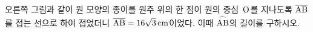 \noindent\begin{minipage}[t]{0.58\linewidth}\vspace{0pt}\raggedright 오른쪽 그림과 같이 원 모양의 종이를 원주 위의 한 점이 원의 중심~$\mathrm{O}$를 지나도록 $\overline{\mathrm{AB}}$를 접는 선으로 하여 접었더니 $\overline{\mathrm{AB}}=16\sqrt{3}\,\mathrm{cm}$이었다. 이때 $\overset{\frown}{\mathrm{AB}}$의 길이를 구하시오.\end{minipage}\hfill\begin{minipage}[t]{0.4\linewidth}\vspace{0pt}\centering \resizebox{\ifdim\width>\linewidth\linewidth\else\width\fi}{!}{}\end{minipage}\par
